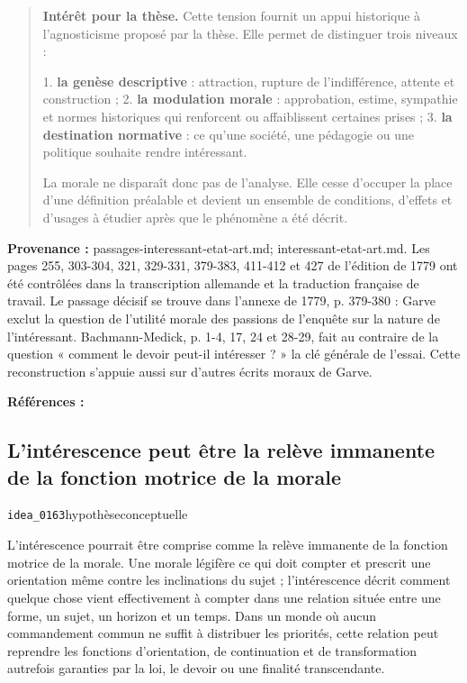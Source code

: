 \documentclass[10pt,a4paper]{article}
\begin{document}
\begin{quote}
\textbf{Intérêt pour la thèse.} Cette tension fournit un appui historique à l'agnosticisme proposé par la thèse. Elle permet de distinguer trois niveaux :

1. \textbf{la genèse descriptive} : attraction, rupture de l'indifférence, attente et    construction ; 2. \textbf{la modulation morale} : approbation, estime, sympathie et normes historiques    qui renforcent ou affaiblissent certaines prises ; 3. \textbf{la destination normative} : ce qu'une société, une pédagogie ou une politique    souhaite rendre intéressant.

La morale ne disparaît donc pas de l'analyse. Elle cesse d'occuper la place d'une définition préalable et devient un ensemble de conditions, d'effets et d'usages à étudier après que le phénomène a été décrit.
\end{quote}
{\footnotesize\color{metadata}\textbf{Provenance :} passages-interessant-etat-art.md; interessant-etat-art.md. Les pages 255, 303-304, 321, 329-331, 379-383, 411-412 et 427 de l'édition de 1779 ont été contrôlées dans la transcription allemande et la traduction française de travail. Le passage décisif se trouve dans l'annexe de 1779, p. 379-380 : Garve exclut la question de l'utilité morale des passions de l'enquête sur la nature de l'intéressant. Bachmann-Medick, p. 1-4, 17, 24 et 28-29, fait au contraire de la question « comment le devoir peut-il intéresser ? » la clé générale de l'essai. Cette reconstruction s'appuie aussi sur d'autres écrits moraux de Garve.\par}
{\footnotesize\color{metadata}\textbf{Références :} \parencite{garve1779interessirende,bachmannmedick2008anziehungskraft}\par}

\subsection{L'intérescence peut être la relève immanente de la fonction motrice de la morale}
{\small\color{metadata} \texttt{idea\_0163}\quad\textbullet\quad hypothèse\quad\textbullet\quad conceptuelle\par}

L'intérescence pourrait être comprise comme la relève immanente de la fonction motrice de la morale. Une morale légifère ce qui doit compter et prescrit une orientation même contre les inclinations du sujet ; l'intérescence décrit comment quelque chose vient effectivement à compter dans une relation située entre une forme, un sujet, un horizon et un temps. Dans un monde où aucun commandement commun ne suffit à distribuer les priorités, cette relation peut reprendre les fonctions d'orientation, de continuation et de transformation autrefois garanties par la loi, le devoir ou une finalité transcendante.
\end{document}
